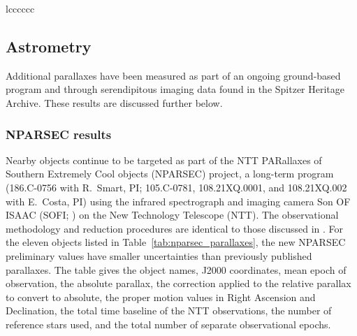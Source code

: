 \documentclass[twocolumn,tighten,twocolappendix]{aastex631}
\begin{document}
\begin{deluxetable*}{lcccccc}
\end{deluxetable*}

\subsection{Astrometry\label{sec:appendix_astrometry}}

Additional parallaxes have been measured as part of an ongoing ground-based program and through serendipitous imaging data found in the Spitzer Heritage Archive. These results are discussed further below.

\subsubsection{NPARSEC results\label{sec:nparsec_astrometry}}

Nearby objects continue to be targeted as part of the NTT PARallaxes of Southern Extremely Cool objects (NPARSEC) project, a long-term program (186.C-0756 with R.\ Smart, PI; 105.C-0781, 108.21XQ.0001, and 108.21XQ.002 with E.\ Costa, PI) using the infrared spectrograph and imaging camera Son OF ISAAC (SOFI; \citealt{moorwood1998}) on the New Technology Telescope (NTT). The observational methodology and reduction procedures are identical to those discussed in \cite{smart2013}. For the eleven objects listed in Table~\ref{tab:nparsec_parallaxes}, the new NPARSEC preliminary values have smaller uncertainties than previously published parallaxes. The table gives the object names, J2000 coordinates, mean epoch of observation, the absolute parallax, the correction applied to the relative parallax to convert to absolute, the proper motion values in Right Ascension and Declination, the total time baseline of the NTT observations, the number of reference stars used, and the total number of separate observational epochs. 
\end{document}
